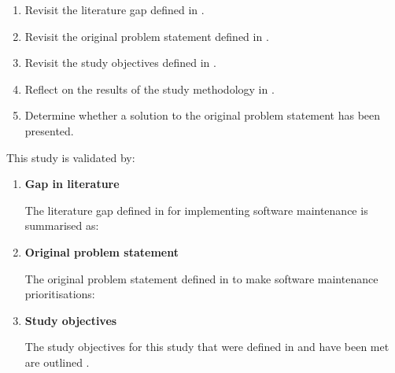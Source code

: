 \begin{enumerate}[label=\textbf{\Roman*.}]
	\item Revisit the literature gap defined in .
	\item Revisit the original problem statement defined in .
	\item Revisit the study objectives defined in .
	\item Reflect on the results of the study methodology in .
	\item Determine whether a solution to the original problem statement has been presented. 
\end{enumerate}

This study is validated by:

\begin{enumerate}[label=\textbf{\Roman*.}]
	\item \textbf{Gap in literature} \par The literature gap defined in  for implementing software maintenance is summarised as: 
		\begin{center}
			\begin{tcolorbox}[colback=lightgray, colframe=black, sharp corners=all, arc=4pt]
				\begin{minipage}{\textwidth}
					\RaggedRight\textit{\studyGap}
				\end{minipage}
			\end{tcolorbox}
		\end{center}

	\item \textbf{Original problem statement} \par The original problem statement defined in  to make software maintenance prioritisations:
		\begin{center}
			\begin{tcolorbox}[colback=lightgray, colframe=black, sharp corners=all, arc=4pt]
				\begin{minipage}{\textwidth}
					\RaggedRight\textit{\problemStatement}
				\end{minipage}
			\end{tcolorbox}
		\end{center}

	\item \textbf{Study objectives} \par The study objectives for this study that were defined in  and have been met are outlined . 


\end{enumerate}
